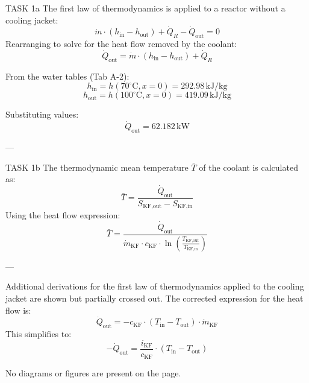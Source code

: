 TASK 1a  
The first law of thermodynamics is applied to a reactor without a cooling jacket:  
\[
\dot{m} \cdot (h_{\text{in}} - h_{\text{out}}) + \dot{Q}_R - \dot{Q}_{\text{out}} = 0
\]  
Rearranging to solve for the heat flow removed by the coolant:  
\[
\dot{Q}_{\text{out}} = \dot{m} \cdot (h_{\text{in}} - h_{\text{out}}) + \dot{Q}_R
\]  

From the water tables (Tab A-2):  
\[
h_{\text{in}} = h(70^\circ\text{C}, x = 0) = 292.98 \, \text{kJ/kg}
\]  
\[
h_{\text{out}} = h(100^\circ\text{C}, x = 0) = 419.09 \, \text{kJ/kg}
\]  

Substituting values:  
\[
\dot{Q}_{\text{out}} = 62.182 \, \text{kW}
\]  

---

TASK 1b  
The thermodynamic mean temperature \( \bar{T} \) of the coolant is calculated as:  
\[
\bar{T} = \frac{\dot{Q}_{\text{out}}}{S_{\text{KF,out}} - S_{\text{KF,in}}}
\]  
Using the heat flow expression:  
\[
\bar{T} = \frac{\dot{Q}_{\text{out}}}{\dot{m}_{\text{KF}} \cdot c_{\text{KF}} \cdot \ln\left(\frac{T_{\text{KF,out}}}{T_{\text{KF,in}}}\right)}
\]  

---

Additional derivations for the first law of thermodynamics applied to the cooling jacket are shown but partially crossed out. The corrected expression for the heat flow is:  
\[
\dot{Q}_{\text{out}} = -c_{\text{KF}} \cdot (T_{\text{in}} - T_{\text{out}}) \cdot \dot{m}_{\text{KF}}
\]  
This simplifies to:  
\[
-\dot{Q}_{\text{out}} = \frac{i_{\text{KF}}}{c_{\text{KF}}} \cdot (T_{\text{in}} - T_{\text{out}})
\]  

No diagrams or figures are present on the page.